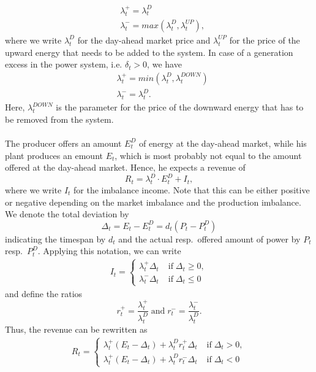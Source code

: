 \begin{align*}
	&\lambda_{t}^{+}=\lambda_{t}^{D}
	\\ &\lambda_{t}^{-}=max\left(\lambda_{t}^{D}, \lambda_{t}^{UP}\right),
\end{align*}
where we write $\lambda_{t}^{D}$ for the day-ahead market price and $\lambda_{t}^{UP}$ for the price of the upward energy that needs to be added to the system. In case of a generation excess in the power system, i.e. $\delta_{t}>0$, we have 
\begin{align*}
	&\lambda_{t}^{+}=min\left(\lambda_{t}^{D}, \lambda_{t}^{DOWN}\right)
	\\ &\lambda_{t}^{-}=\lambda_{t}^{D}.
\end{align*} 
Here, $\lambda_{t}^{DOWN}$ is the parameter for the price of the downward energy that has to be removed from the system. 
\\ \\
The producer offers an amount $E_{t}^{D}$ of energy at the day-ahead market, while his plant produces an emount $E_{t}$, which is most probably not equal to the amount offered at the day-ahead market. Hence, he expects a revenue of
\begin{equation*}
	R_{t}=\lambda_{t}^{D}\cdot E_{t}^{D} + I_{t},
\end{equation*}
where we write $I_{t}$ for the imbalance income. Note that this can be either positive or negative depending on the market imbalance and the production imbalance. We denote the total deviation by
\begin{equation*}
	\Delta_{t}=E_{t}-E_{t}^{D}=d_{t}\left(P_{t}-P_{t}^{D}\right)
\end{equation*}
indicating the timespan by $d_{t}$ and the actual resp.\ offered amount of power by $P_{t}$ resp.\ $P_{t}^{D}$. Applying this notation, we can write
\begin{align*}
	I_{t}= \begin{cases}
		\lambda_{t}^{+}\Delta_{t} &\mathrm{\; if \;} \Delta_{t} \geq 0,
		\\ \lambda_{t}^{-}\Delta_{t} &\mathrm{\; if \;} \Delta_{t}\leq 0
	\end{cases}
\end{align*}
and define the ratios 
\begin{equation*}
	r_{t}^{+}= \frac{\lambda_{t}^{+}}{\lambda_{t}^{D}} \mathrm{\; and \;} r_{t}^{-}=\frac{\lambda_{t}^{-}}{\lambda_{t}^{D}}.
\end{equation*}
Thus, the revenue can be rewritten as
\begin{align*}
	R_{t}= \begin{cases}
		\lambda_{t}^{+}\left(E_{t}-\Delta_{t}\right)+\lambda_{t}^{D}r_{t}^	{+}\Delta_{t} &\mathrm{\; if \;} \Delta_{t} > 0,
		\\ \lambda_{t}^{+}\left(E_{t}-\Delta_{t}\right)+\lambda_{t}^{D}r_{t}^	{-}\Delta_{t} &\mathrm{\; if \;} \Delta_{t}< 0
	\end{cases}
\end{align*} 
